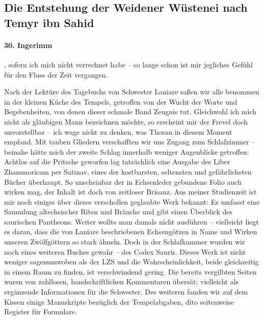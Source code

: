 \subsection{Die Entstehung der Weidener Wüstenei nach Temyr ibn Sahid}

\paragraph{30. Ingerimm}, sofern ich mich nicht verrechnet habe -- so lange schon ist mir jegliches Gefühl für den Fluss der Zeit vergangen.


Nach der Lektüre des Tagebuchs von Schwester Laniare saßen wir alle benommen in der kleinen Küche des Tempels, getroffen von der Wucht der Worte und Begebenheiten, von denen dieser schmale Band Zeugnis tut. Gleichwohl ich mich nicht als gläubigen Mann bezeichnen möchte, so erscheint mir der Frevel doch unvorstellbar -- ich wage nicht zu denken, was Thoran in diesem Moment empfand. Mit tauben Gliedern verschafften wir uns Zugang zum Schlafzimmer -- beinahe hätte mich der zweite Schlag innerhalb weniger Augenblicke getroffen: Achtlos auf die Pritsche geworfen lag tatsächlich eine Ausgabe des Liber Zhammoricam per Satinav, eines der kostbarsten, seltensten und gefährlichsten Bücher überhaupt. So unscheinbar der in Echsenleder gebundene Folio auch wirken mag, der Inhalt ist doch von zeitloser Brisanz. Aus meiner Studienzeit ist mir noch einiges über dieses verschollen geglaubte Werk bekannt: Es umfasst eine Sammlung altechsischer Riten und Bräuche und gibt einen Überblick des saurischen Pantheons. Weiter wollte man damals nicht ausführen -- vielleicht liegt es daran, dass die von Laniare beschriebenen Echsengötzen in Name und Wirken unseren Zwölfgöttern so stark ähneln. Doch in der Schlafkammer wurden wir noch eines weiteren Buches gewahr -- des Codex Sauris. Dieses Werk ist nicht weniger sagenumwoben als der LZS und die Wahrscheinlichkeit, beide gleichzeitig in einem Raum zu finden, ist verschwindend gering. Die bereits vergilbten Seiten waren von zahllosen, handschriftlichen Kommentaren übersät; vielleicht als ergänzende Informationen für die Schwester. Des weiteren fanden wir auf dem Kissen einige Manuskripte bezüglich der Tempelabgaben, dito seitenweise Register für Formulare.


